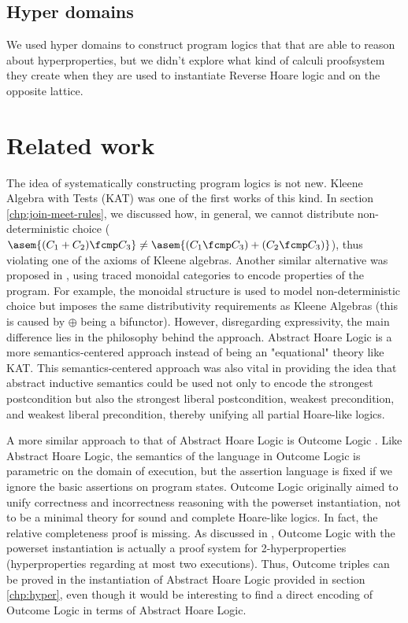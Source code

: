 \subsection{Hyper domains}
We used hyper domains to construct program logics that that are able to reason
about hyperproperties, but we didn't explore what kind of calculi proofsystem 
they create when they are used to instantiate Reverse Hoare logic and on the 
opposite lattice.

\section{Related work}

The idea of systematically constructing program logics is not new. Kleene
Algebra with Tests (KAT) \cite{Kozen97} was one of the first works of this
kind. In section \ref{chp:join-meet-rules}, we discussed how, in general, we
cannot distribute non-deterministic choice ($\asem{(C_1 + C_2) \fcmp C_3} \neq
\asem{(C_1 \fcmp C_3) + (C_2 \fcmp C_3)}$), thus violating one of the axioms of
Kleene algebras. Another similar alternative was proposed in \cite{Martin06},
using traced monoidal categories to encode properties of the program. For
example, the monoidal structure is used to model non-deterministic choice but
imposes the same distributivity requirements as Kleene Algebras (this is caused
by $\oplus$ being a bifunctor). However, disregarding expressivity, the main
difference lies in the philosophy behind the approach. Abstract Hoare Logic is
a more semantics-centered approach instead of being an "equational" theory like
KAT. This semantics-centered approach was also vital in providing the idea that
abstract inductive semantics could be used not only to encode the strongest
postcondition but also the strongest liberal postcondition, weakest
precondition, and weakest liberal precondition, thereby unifying all partial
Hoare-like logics.

A more similar approach to that of Abstract Hoare Logic is Outcome Logic
\cite{Zilberstein23}. Like Abstract Hoare Logic, the semantics of the language
in Outcome Logic is parametric on the domain of execution, but the assertion
language is fixed if we ignore the basic assertions on program states. Outcome
Logic originally aimed to unify correctness and incorrectness reasoning with
the powerset instantiation, not to be a minimal theory for sound and complete
Hoare-like logics. In fact, the relative completeness proof is missing. As
discussed in \cite{Darnier2023}, Outcome Logic with the powerset instantiation
is actually a proof system for 2-hyperproperties (hyperproperties regarding at
most two executions). Thus, Outcome triples can be proved in the instantiation
of Abstract Hoare Logic provided in section \ref{chp:hyper}, even though it
would be interesting to find a direct encoding of Outcome Logic in terms of
Abstract Hoare Logic.
